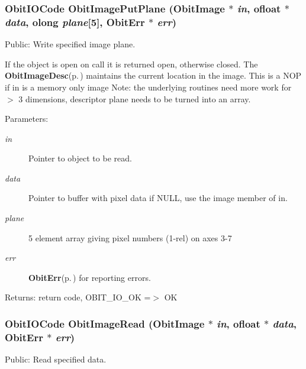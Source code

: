 \subsubsection{\setlength{\rightskip}{0pt plus 5cm}Obit\-IOCode Obit\-Image\-Put\-Plane ({\bf Obit\-Image} $\ast$ {\em in}, {\bf ofloat} $\ast$ {\em data}, {\bf olong} {\em plane}[5], {\bf Obit\-Err} $\ast$ {\em err})}\label{ObitImage_8c_a26}


Public: Write specified image plane. 

If the object is open on call it is returned open, otherwise closed. The {\bf Obit\-Image\-Desc}{\rm (p.\,\pageref{structObitImageDesc})} maintains the current location in the image. This is a NOP if in is a memory only image Note: the underlying routines need more work for $>$ 3 dimensions, descriptor plane needs to be turned into an array. \begin{Desc}
\item[Parameters:]
\begin{description}
\item[{\em in}]Pointer to object to be read. \item[{\em data}]Pointer to buffer with pixel data if NULL, use the image member of in. \item[{\em plane}]5 element array giving pixel numbers (1-rel) on axes 3-7 \item[{\em err}]{\bf Obit\-Err}{\rm (p.\,\pageref{structObitErr})} for reporting errors. \end{description}
\end{Desc}
\begin{Desc}
\item[Returns:]return code, OBIT\_\-IO\_\-OK =$>$ OK \end{Desc}
\subsubsection{\setlength{\rightskip}{0pt plus 5cm}Obit\-IOCode Obit\-Image\-Read ({\bf Obit\-Image} $\ast$ {\em in}, {\bf ofloat} $\ast$ {\em data}, {\bf Obit\-Err} $\ast$ {\em err})}\label{ObitImage_8c_a23}


Public: Read specified data. 

